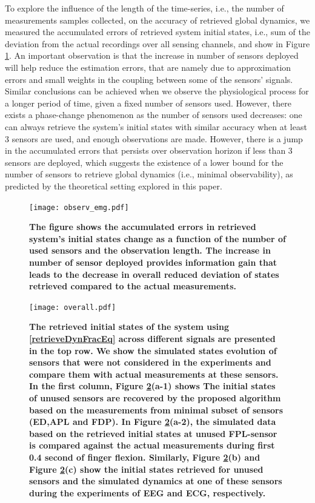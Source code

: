  To explore the influence of the length of the time-series, i.e., the number of measurements samples collected, on the accuracy of retrieved global dynamics, we measured the accumulated errors of retrieved system initial states, i.e.,  sum of the deviation from the actual recordings over all sensing channels, and show in Figure \ref{fig:observ_emg}. An important observation is that the increase in number of sensors deployed will help reduce the estimation errors, that are namely  due to approximation errors and small weights in the coupling between some of the sensors' signals. Similar conclusions can be achieved when we observe the physiological process for a longer period of  time, given a fixed number of sensors used.  However, there exists a phase-change phenomenon as the number of sensors used decreases: one can always retrieve the system's initial states with similar accuracy when at least 3 sensors are used, and enough observations are made. However, there is a jump in the accumulated errors that persists over observation horizon if less than 3 sensors are deployed, which suggests the existence of a lower bound for the number of sensors to retrieve global dynamics (i.e., minimal observability), as predicted by the theoretical setting explored in this paper.
 \begin{figure}[htb]
\centering
\texttt{[image: observ\_emg.pdf]}
\caption{\textbf{The figure shows the accumulated errors in retrieved system's initial states change as a function of the number of used sensors and the observation length. The increase in number of sensor deployed provides information gain that leads to the decrease in overall reduced deviation of states retrieved compared to the actual measurements.}}\label{fig:observ_emg}
\vskip -4mm
\end{figure} 
\begin{figure}[htb]
\centering
\texttt{[image: overall.pdf]}
\caption{\textbf{ The retrieved initial states of the system using \eqref{retrieveDynFracEq} across different signals are presented in the top row. We show the simulated states evolution of sensors that were not considered in the experiments and compare them with actual measurements at these sensors. In the first column, Figure \ref{fig:exp_result}(a-1) shows The initial states of unused sensors are recovered by the proposed algorithm based on the measurements from minimal subset of sensors (ED,APL and FDP). In Figure \ref{fig:exp_result}(a-2), the simulated data based on the retrieved initial states at unused FPL-sensor is compared against the actual measurements during first 0.4 second of finger flexion. Similarly, Figure \ref{fig:exp_result}(b) and Figure \ref{fig:exp_result}(c) show the initial states retrieved for unused sensors and the simulated dynamics at one of these sensors during the experiments of EEG and ECG, respectively.}}\label{fig:exp_result}
\vskip -5mm
\end{figure}  
 
